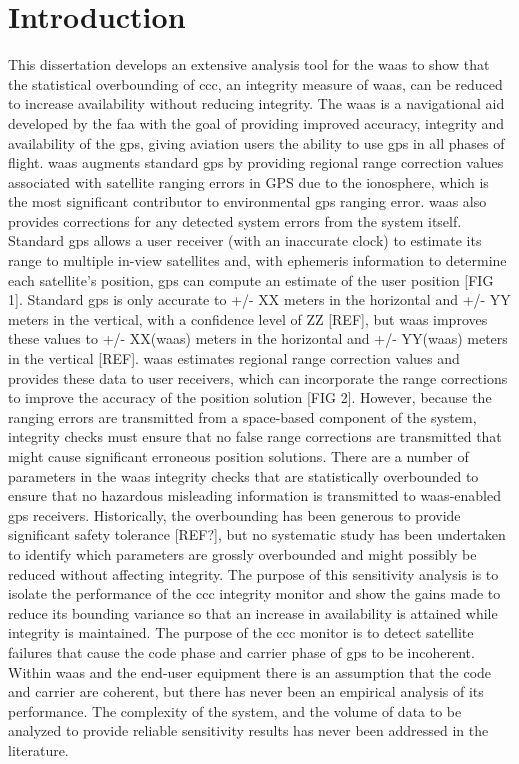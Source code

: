 \acresetall
\chapter{Introduction}
\label{chapter:introduction}

This dissertation develops an extensive analysis tool for the \ac{waas} to show that the statistical overbounding of \ac{ccc}, an integrity measure of \ac{waas}, can be reduced to increase availability without reducing integrity. The \ac{waas} is a navigational aid developed by the \ac{faa} with the goal of providing improved accuracy, integrity and availability of the \ac{gps}, giving aviation users the ability to use \ac{gps} in all phases of flight.  \ac{waas} augments standard \ac{gps} by providing regional range correction values associated with satellite ranging errors in GPS due to the ionosphere, which is the most significant contributor to environmental \ac{gps} ranging error.  \ac{waas} also provides corrections for any detected system errors from the system itself.  Standard \ac{gps} allows a user receiver (with an inaccurate clock) to estimate its range to multiple in-view satellites and, with ephemeris information to determine each satellite's position, \ac{gps} can compute an estimate of the user position [FIG 1].  Standard \ac{gps}  is only accurate to +/- XX meters in the horizontal and +/- YY meters in the vertical, with a confidence level of ZZ [REF], but \ac{waas} improves these values to +/- XX(waas) meters in the horizontal and +/- YY(waas) meters in the vertical [REF]. \ac{waas} estimates regional range correction values and provides these data to user receivers, which can incorporate the range corrections to improve the accuracy of the position solution [FIG 2]. However, because the ranging errors are transmitted from a space-based component of the system, integrity checks must ensure that no false range corrections are transmitted that might cause significant erroneous position solutions.  There are a number of parameters in the \ac{waas} integrity checks that are statistically overbounded to ensure that no hazardous misleading information is transmitted to \ac{waas}-enabled \ac{gps} receivers.  Historically, the overbounding has been generous to provide significant safety tolerance [REF?], but no systematic study has been undertaken to identify which parameters are grossly overbounded and might possibly be reduced without affecting integrity.   The purpose of this sensitivity analysis is to isolate the performance of the \ac{ccc} integrity monitor and show the gains made to reduce its bounding variance so that an increase in availability is attained while integrity is maintained. The purpose of the \ac{ccc} monitor is to detect satellite failures that cause the code phase and carrier phase of \ac{gps} to be incoherent.  Within \ac{waas} and the end-user equipment there is an assumption that the code and carrier are coherent, but there has never been an empirical analysis of its performance.  The complexity of the system, and the volume of data to be analyzed to provide reliable sensitivity results has never been addressed in the literature.
